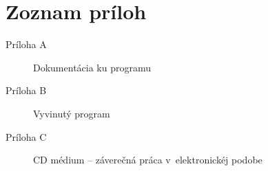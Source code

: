 
\chapter*{Zoznam príloh}

\begin{description}
    \item[Príloha A] Dokumentácia ku programu 
    \item[Príloha B] Vyvinutý program
    \item[Príloha C] CD médium -- záverečná práca v~elektronickéj podobe
\end{description}
